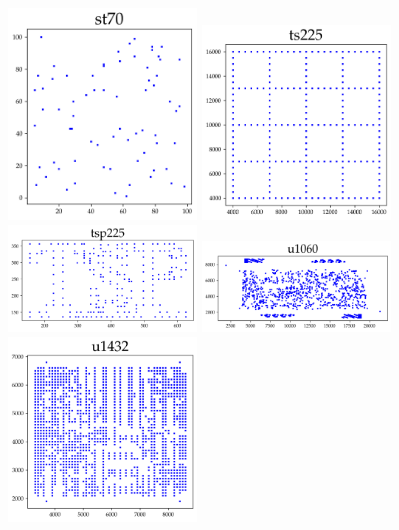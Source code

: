 \begin{appendices}
\begin{figure}[H]
\centering
\includegraphics[width=5cm]{../tsplib_euc2d_pictures_of_instances/st70.png}
\includegraphics[width=5cm]{../tsplib_euc2d_pictures_of_instances/ts225.png}
\includegraphics[width=5cm]{../tsplib_euc2d_pictures_of_instances/tsp225.png}
\includegraphics[width=5cm]{../tsplib_euc2d_pictures_of_instances/u1060.png}
\includegraphics[width=5cm]{../tsplib_euc2d_pictures_of_instances/u1432.png}

\end{figure}
\end{appendices}
